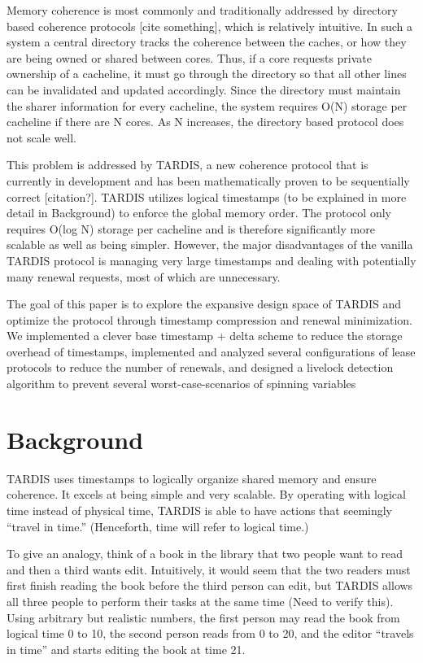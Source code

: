 \documentclass[12pt]{article}
\begin{document}
Memory coherence is most commonly and traditionally addressed by directory based coherence protocols [cite something], which is relatively intuitive. In such a system a central directory tracks the coherence between the caches, or how they are being owned or shared between cores. Thus, if a core requests private ownership of a cacheline, it must go through the directory so that all other lines can be invalidated and updated accordingly. Since the directory must maintain the sharer information for every cacheline, the system requires O(N) storage per cacheline if there are N cores. As N increases, the directory based protocol does not scale well.

This problem is addressed by TARDIS, a new coherence protocol that is currently in development and has been mathematically proven to be sequentially correct [citation?]. TARDIS utilizes logical timestamps (to be explained in more detail in Background) to enforce the global memory order. The protocol only requires O(log N) storage per cacheline and is therefore significantly more scalable as well as being simpler. However, the major disadvantages of the vanilla TARDIS protocol is managing very large timestamps and dealing with potentially many renewal requests, most of which are unnecessary. 

The goal of this paper is to explore the expansive design space of TARDIS and optimize the protocol through timestamp compression and renewal minimization. We implemented a clever base timestamp + delta scheme to reduce the storage overhead of timestamps, implemented and analyzed several configurations of lease protocols to reduce the number of renewals, and designed a livelock detection algorithm to prevent several worst-case-scenarios of spinning variables

\section{Background}
TARDIS uses timestamps to logically organize shared memory and ensure coherence. It excels at being simple and very scalable. By operating with logical time instead of physical time, TARDIS is able to have actions that seemingly “travel in time.” (Henceforth, time will refer to logical time.)

To give an analogy, think of a book in the library that two people want to read and then a third wants edit. Intuitively, it would seem that the two readers must first finish reading the book before the third person can edit, but TARDIS allows all three people to perform their tasks at the same time (Need to verify this).  Using arbitrary but realistic numbers, the first person may read the book from logical time 0 to 10, the second person reads from 0 to 20, and the editor “travels in time” and starts editing the book at time 21.
\end{document}
